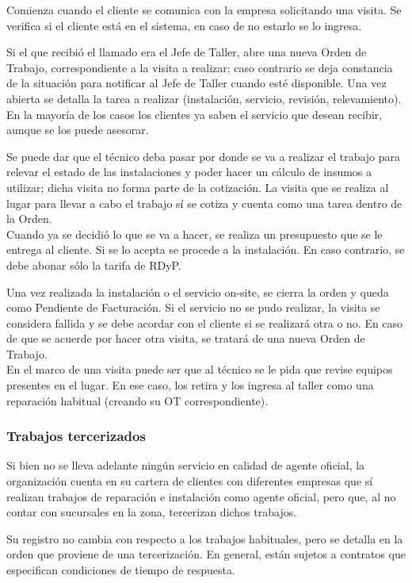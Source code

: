 \documentclass[12pt]{extarticle}
\begin{document}
\begin{spacing}{1.2}
    Comienza cuando el cliente se comunica con la empresa solicitando una visita. Se verifica si el cliente está en el sistema, en caso de no estarlo se lo ingresa.

    Si el que recibió el llamado era el Jefe de Taller, abre una nueva Orden de Trabajo, correspondiente a la visita a realizar; caso contrario se deja constancia de la situación para notificar al Jefe de Taller cuando esté disponible. 
    Una vez abierta se detalla la tarea a realizar (instalación, servicio, revisión, relevamiento). En la mayoría de los casos los clientes ya saben el servicio que desean recibir, aunque se los puede asesorar.

    Se puede dar que el técnico deba pasar por donde se va a realizar el trabajo para relevar el estado de las instalaciones y poder hacer un cálculo de insumos a utilizar; dicha visita no forma parte de la cotización. La visita que se realiza al lugar para llevar a cabo el trabajo sí se cotiza y cuenta como una tarea dentro de la Orden.\\

    Cuando ya se decidió lo que se va a hacer, se realiza un presupuesto que se le entrega al cliente. Si se lo acepta se procede a la instalación. En caso contrario, se debe abonar sólo la tarifa de RDyP.

    Una vez realizada la instalación o el servicio on-site, se cierra la orden y queda como Pendiente de Facturación. Si el servicio no se pudo realizar, la visita se considera fallida y se debe acordar con el cliente si se realizará otra o no. En caso de que se acuerde por hacer otra visita, se tratará de una nueva Orden de Trabajo.\\ 

    En el marco de una visita puede ser que al técnico se le pida que revise equipos presentes en el lugar. En ese caso, los retira y los ingresa al taller como una reparación habitual (creando su OT correspondiente).

    \subsubsection{Trabajos tercerizados}
    Si bien no se lleva adelante ningún servicio en calidad de agente oficial, la organización cuenta en su cartera de clientes con diferentes empresas que sí realizan trabajos de reparación e instalación como agente oficial, pero que, al no contar con sucursales en la zona, tercerizan dichos trabajos.

    Su registro no cambia con respecto a los trabajos habituales, pero se detalla en la orden que proviene de una tercerización.
    En general, están sujetos a contratos que especifican condiciones de tiempo de respuesta.\\


\end{spacing}
\end{document}
